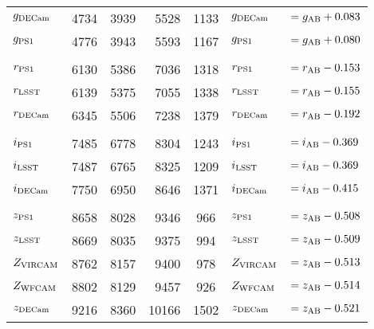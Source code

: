 \documentclass[usenatbib]{mnras}
\begin{document}
\begin{table*}
\begin{center}
\begin{tabular}{l r r r  c l l}
      $g_{\rm DECam}$  &      4734     &   3939    &    5528   &   1133        &  $g_{\rm DECam} $    &$  = g_{\rm AB} + 0.083 $ \\	     
      $g_{\rm PS1}$        &    4776    &    3943    &    5593   &   1167        &  $g_{\rm PS1}$         &$  = g_{\rm AB} + 0.080 $ \\   %
      &&&&&&\\
      $r_{\rm PS1}$         &    6130    & 	  5386    &    7036   &   1318       &  $r_{\rm PS1}   $       &$     = r_{\rm AB} - 0.153 $ \\ %
      $r_{\rm LSST}$       &     6139    &	  5375    &    7055   &   1338      &  $r_{\rm LSST}   $       &$    = r_{\rm AB} - 0.155 $ \\	
      $r_{\rm DECam}$   &      6345    &    5506    &    7238   &   1379      &  $r_{\rm DECam}$       &$   = r_{\rm AB} - 0.192 $ \\	     
      &&&&&&\\
      $i_{\rm PS1}$         &    7485    &     6778    &    8304   &   1243      &  $i_{\rm PS1}    $       &$   = i_{\rm AB} - 0.369 $ \\  %
      $i_{\rm LSST}$       &     7487    &	  6765    &     8325   &   1209      &  $i_{\rm LSST}   $       &$    = i_{\rm AB} - 0.369 $ \\   %
      $i_{\rm DECam}$   &      7750   &	  6950    &     8646    &   1371      &  $i_{\rm DECam} $     &$  = i_{\rm AB} - 0.415 $        \\	   
      &&&&&&\\
      $z_{\rm PS1}$        &    8658    &	 8028    &      9346   &      966      &  $z_{\rm PS1}   $      &$    = z_{\rm AB} - 0.508 $       \\
      $z_{\rm LSST}$      &     8669   & 	 8035    &      9375   &      994     &   $z_{\rm LSST}  $      &$    = z_{\rm AB} - 0.509 $     \\
      $Z_{\rm VIRCAM}$  &     8762   & 	 8157    &      9400   &      978    &   $Z_{\rm VIRCAM}  $   &$    = z_{\rm AB} - 0.513 $     \\
      $Z_{\rm WFCAM}$  &     8802   & 	 8129    &      9457   &      926    &   $Z_{\rm WFCAM}  $   &$    = z_{\rm AB} - 0.514 $     \\
      $z_{\rm DECam}$  &      9216   & 	 8360    &    10166   &   1502      &  $z_{\rm DECam} $     &$   = z_{\rm AB} - 0.521 $ \\

\end{tabular}
\end{center}
\end{table*}
\end{document}
